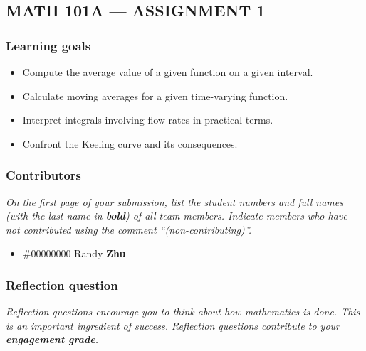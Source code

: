\documentclass[answers]{exam}
\begin{document}
\subsection*{MATH 101A --- ASSIGNMENT 1}

\subsubsection*{Learning goals}
\begin{itemize}
    \setlength\itemsep{0.1em}
    \item Compute the average value of a given function on a given interval.
    \item Calculate moving averages for a given time-varying function.
    \item Interpret integrals involving flow rates in practical terms.
    \item Confront the Keeling curve and its consequences.
\end{itemize}

\subsubsection*{Contributors}

\textit{On the first page of your submission, list the student numbers and full names (with the last name in \textbf{bold}) of all team members. Indicate members who have not contributed using the comment ``(non-contributing)''.}

\begin{itemize}
    \item \#00000000 Randy {\bf Zhu}
\end{itemize}

\subsubsection*{Reflection question}

\textit{Reflection questions encourage you to think about how mathematics is done. This is an important ingredient of success. Reflection questions contribute to your \textbf{engagement grade}.}
\end{document}
